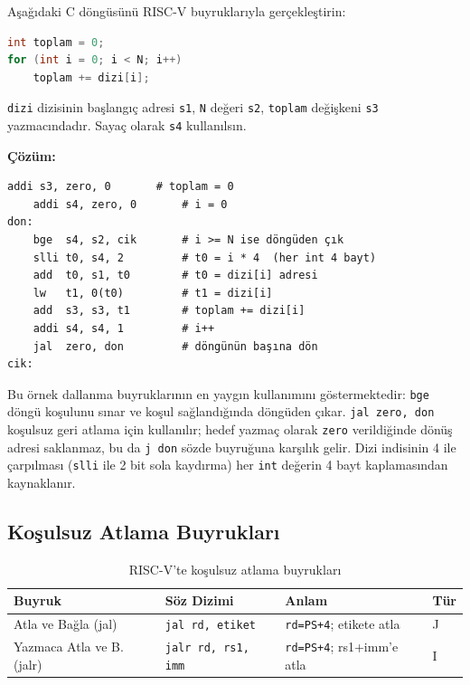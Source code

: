 \begin{ornek}[3.16]
\label{orn:dongu}
Aşağıdaki C döngüsünü RISC-V buyruklarıyla gerçekleştirin:
\begin{lstlisting}[language=C]
int toplam = 0;
for (int i = 0; i < N; i++)
    toplam += dizi[i];
\end{lstlisting}
\texttt{dizi} dizisinin başlangıç adresi \texttt{s1}, \texttt{N} değeri \texttt{s2}, \texttt{toplam} değişkeni \texttt{s3} yazmacındadır. Sayaç olarak \texttt{s4} kullanılsın.

\textbf{Çözüm:}
\begin{lstlisting}[style=riscv]
    addi s3, zero, 0       # toplam = 0
    addi s4, zero, 0       # i = 0
don:
    bge  s4, s2, cik       # i >= N ise döngüden çık
    slli t0, s4, 2         # t0 = i * 4  (her int 4 bayt)
    add  t0, s1, t0        # t0 = dizi[i] adresi
    lw   t1, 0(t0)         # t1 = dizi[i]
    add  s3, s3, t1        # toplam += dizi[i]
    addi s4, s4, 1         # i++
    jal  zero, don         # döngünün başına dön
cik:
\end{lstlisting}

Bu örnek dallanma buyruklarının en yaygın kullanımını göstermektedir: \texttt{bge} döngü koşulunu sınar ve koşul sağlandığında döngüden çıkar. \texttt{jal zero, don} koşulsuz geri atlama için kullanılır; hedef yazmaç olarak \texttt{zero} verildiğinde dönüş adresi saklanmaz, bu da \texttt{j don} sözde buyruğuna karşılık gelir. Dizi indisinin 4 ile çarpılması (\texttt{slli} ile 2 bit sola kaydırma) her \texttt{int} değerin 4 bayt kaplamasından kaynaklanır.
\end{ornek}

\subsection{Koşulsuz Atlama Buyrukları}

\begin{table}[H]
\centering
\caption{RISC-V'te koşulsuz atlama buyrukları}
\label{tab:atlama-buyruklar}
\begin{tabular}{llll}
\toprule
\textbf{Buyruk} & \textbf{Söz Dizimi} & \textbf{Anlam} & \textbf{Tür} \\
\midrule
Atla ve Bağla (jal)   & \texttt{jal rd, etiket}     & \texttt{rd=PS+4}; etikete atla    & J \\
Yazmaca Atla ve B. (jalr) & \texttt{jalr rd, rs1, imm} & \texttt{rd=PS+4}; rs1+imm'e atla & I \\
\bottomrule
\end{tabular}
\end{table}


